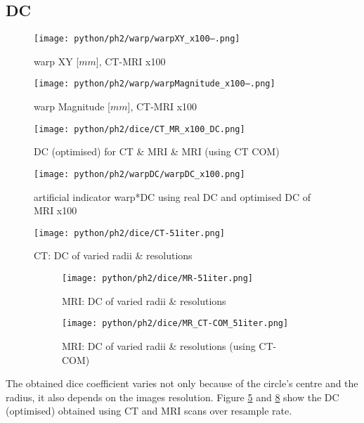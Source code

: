 \clearpage

\subsection{DC}

\begin{figure}[!bp]
  \centering
  \texttt{[image: python/ph2/warp/warpXY\_x100--.png]}
  \caption{warp XY [$mm$], CT-MRI x100}
  \label{fig:warpXY_x100}
\end{figure}

\begin{figure}[!tp]
    \centering
    \texttt{[image: python/ph2/warp/warpMagnitude\_x100--.png]}
    \caption{warp Magnitude [$mm$], CT-MRI x100}
    \label{fig:warpMagnitude_x100}
\end{figure}
\begin{figure}[!bp]
    \centering
    \texttt{[image: python/ph2/dice/CT\_MR\_x100\_DC.png]}
    \caption{DC (optimised) for CT \& MRI \& MRI (using CT COM)}
    \label{fig:CT_MR_x100_DC}
\end{figure}

\begin{figure}[!tp]
    \centering
    \texttt{[image: python/ph2/warpDC/warpDC\_x100.png]}
    \caption{artificial indicator warp*DC using real DC and optimised DC of MRI x100}
    \label{fig:warpDC_x100}
\end{figure}
\begin{figure}[!bp]
  \centering
  \texttt{[image: python/ph2/dice/CT-51iter.png]}
  \caption{CT: DC of varied radii \& resolutions}
  \label{fig:CT_dc}
\end{figure}

\begin{figure}[!tbp]
  \begin{subfigure}[b]{\textwidth}
    \centering
    \texttt{[image: python/ph2/dice/MR-51iter.png]}
    \caption{MRI: DC of varied radii \& resolutions}
    \label{fig:MR_dc-opti}
  \end{subfigure}
  \begin{subfigure}[!b]{\textwidth}
    \centering
    \texttt{[image: python/ph2/dice/MR\_CT-COM\_51iter.png]}
    \caption{MRI: DC of varied radii \& resolutions (using CT-COM)}
    \label{fig:MR_CT-COM_dc-opti}
  \end{subfigure}
  \caption{}
  \label{fig:MR_dc}
\end{figure}


The obtained dice coefficient varies not only because of the circle's centre and the radius, it also depends on the images resolution.
Figure \ref{fig:CT_dc} and \ref{fig:MR_dc} show the DC (optimised) obtained using CT and MRI scans over resample rate.

